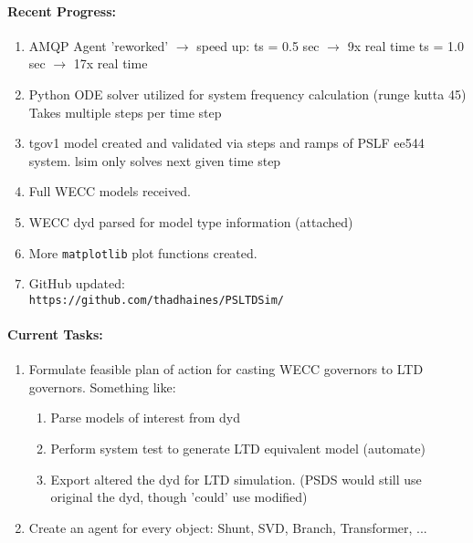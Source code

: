 \documentclass[12pt]{article}
\begin{document}
\begin{multicols}{2}

	\paragraph{Recent Progress:}
	\begin{enumerate}
		\item AMQP Agent 'reworked' $\rightarrow$ speed up:
		\subitem ts = 0.5 sec $\rightarrow$ 9x  real time
		\subitem ts = 1.0 sec $\rightarrow$ 17x real time 
		
		\item Python ODE solver utilized for system frequency calculation (runge kutta 45)
		\subitem Takes multiple steps per time step

		\item tgov1 model created and validated via steps and ramps of PSLF ee544 system.
		\subitem lsim only solves next given time step
		
		\item Full WECC models received.
		\item WECC dyd parsed for model type information (attached)
		
		\item More \verb|matplotlib| plot functions created.

		\item GitHub updated:\\
		\verb|https://github.com/thadhaines/PSLTDSim/|
		
	\end{enumerate}
\paragraph{Current Tasks:}
	\begin{enumerate}
		\item Formulate feasible plan of action for casting WECC governors to LTD governors. Something like:
		\begin{enumerate}
		\item Parse models of interest from dyd
		\item Perform system test to generate LTD equivalent model (automate)
		\item Export altered the dyd for LTD simulation. (PSDS would still use original the dyd, though 'could' use modified)
		\end{enumerate}
		
		\item Create an agent for every object: Shunt, SVD, Branch, Transformer, ...


\end{enumerate}
\end{multicols}
\end{document}
